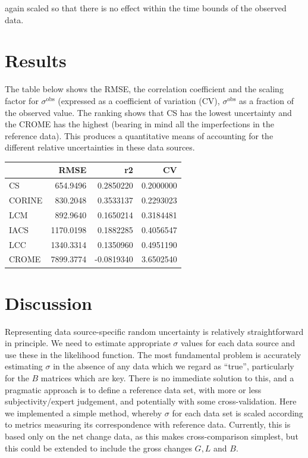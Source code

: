\documentclass[
]{book}
\begin{document}
again scaled so that there is no effect within the time bounds of the observed data.

\hypertarget{results}{%
\section{Results}\label{results}}

The table below shows the RMSE, the correlation coefficient and the scaling factor for \(\sigma^\mathrm{obs}\) (expressed as a coefficient of variation (CV), \(\sigma^\mathrm{obs}\) as a fraction of the observed value.
The ranking shows that CS has the lowest uncertainty and the CROME has the highest (bearing in mind all the imperfections in the reference data). This produces a quantitative means of accounting for the different relative uncertainties in these data sources.

\begin{tabular}{l|r|r|r}
\hline
  & RMSE & r2 & CV\\
\hline
CS & 654.9496 & 0.2850220 & 0.2000000\\
\hline
CORINE & 830.2048 & 0.3533137 & 0.2293023\\
\hline
LCM & 892.9640 & 0.1650214 & 0.3184481\\
\hline
IACS & 1170.0198 & 0.1882285 & 0.4056547\\
\hline
LCC & 1340.3314 & 0.1350960 & 0.4951190\\
\hline
CROME & 7899.3774 & -0.0819340 & 3.6502540\\
\hline
\end{tabular}

\hypertarget{discussion}{%
\section{Discussion}\label{discussion}}

Representing data source-specific random uncertainty is relatively straightforward in principle. We need to estimate appropriate \(\sigma\) values for each data source and use these in the likelihood function.
The most fundamental problem is accurately estimating \(\sigma\) in the absence of any data which we regard as ``true'', particularly for the \(B\) matrices which are key. There is no immediate solution to this, and a pragmatic approach is to define a reference data set, with more or less subjectivity/expert judgement, and potentially with some cross-validation.
Here we implemented a simple method, whereby \(\sigma\) for each data set is scaled according to metrics measuring its correspondence with reference data. Currently, this is based only on the net change data, as this makes cross-comparison simplest, but this could be extended to include the gross changes \(G, L\) and \(B\).
\end{document}
